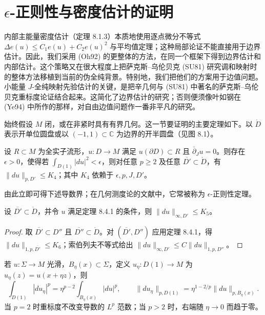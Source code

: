 \section{\texorpdfstring{$\epsilon$}{ε}-正则性与密度估计的证明}
\label{sec:epsilon-regularity-density-estimates}

内部主能量密度估计（定理 8.1.3）本质地使用逐点微分不等式
$\Delta e(u)\leq C_1e(u)+C_2e(u)^2$ 与平均值定理；这种局部论证不能直接用于边界估计。因此，我们采用 (Oh92) 的更整体的方法，在同一个框架下得到边界估计和内部估计。这个策略又在很大程度上把萨克斯--乌伦贝克 (SU81) 研究调和映射时的整体方法移植到当前的伪全纯背景。特别地，我们把他们的方案用于边值问题。小能量 $J$-全纯映射先验估计的关键，是把辛几何与 (SU81) 中著名的萨克斯--乌伦贝克重标度论证结合起来。这简化了边界估计的研究；否则便须像叶如钢在 (Ye94) 中所作的那样，对自由边值问题作一番非平凡的研究。

始终假设 $M$ 闭，或在非紧时具有有界几何。这一节要证明的主要定理如下。以
$\mathring D$ 表示开单位圆盘或以 $(-1,1)\subset\mathbb C$ 为边界的开半圆盘（见图 8.1）。

\begin{theorem}\label{thm:ch8-epsilon-regularity-w1p}
设 $R\subset M$ 为全实子流形，$u:D\to M$ 满足 $u(\partial D)\subset R$ 且
$\bar\partial_Ju=0$。则存在 $\epsilon>0$，使得若
$\int_{D(1)}|du|^2<\epsilon$，则对任意 $p\geq2$ 及任意
$\overline{D'}\subset\mathring D$，有 $\|du\|_{p,D'}\leq K_4$；其中
$K_4$ 依赖于 $\epsilon,p,J,D'$。
\end{theorem}

由此立即可得下述导数界；在几何测度论的文献中，它常被称为 $\epsilon$-正则性定理。
\begin{corollary}\label{cor:ch8-epsilon-regularity}
设 $\overline{D'}\subset\mathring D$，并令 $u$ 满足定理 8.4.1 的条件，则
$\|du\|_{\infty,D'}\leq K_5$。
\end{corollary}
\begin{proof}
取 $\overline{D'}\subset D''$ 且 $\overline{D''}\subset\mathring D$。对 $(\overline{D'},D'')$ 应用定理 8.4.1，得
$\|du\|_{1,p,\overline{D'}}\leq K_6$；索伯列夫不等式给出
$\|du\|_{\infty,D'}\leq C\|du\|_{1,p,D''}$。
\end{proof}

\begin{remark}\label{rem:ch8-rescaling-lp}
若 $u:\Sigma\to M$ 光滑，$B_\eta(x)\subset\Sigma$，定义
$u_\eta:D(1)\to M$ 为 $u_\eta(z)=u(x+\eta z)$，则
\[
 \int_{D(1)}|du_\eta|^p=\eta^{p-2}\int_{B_\eta(x)}|du|^p,\qquad
 \|du_\eta\|_{p,D(1)}=\eta^{1-2/p}\|du\|_{p,B_\eta(x)}.
\]
当 $p=2$ 时重标度不改变导数的 $L^p$ 范数；当 $p>2$ 时，右端随
$\eta\to0$ 而趋于零。
\end{remark}

